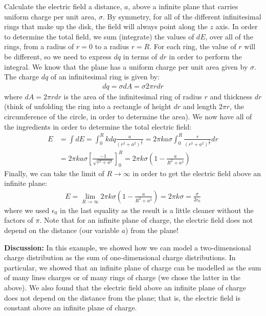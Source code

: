 \begin{example}{\label{ex:chargesfields:squarecircle}Calculate the electric field a distance, $a$, above a infinite plane that carries uniform charge per unit area, $\sigma$.}
By symmetry, for all of the different infinitesimal rings that make up the disk, the field will always point along the $z$ axis. In order to determine the total field, we sum (integrate) the values of $dE$, over all of the rings, from a radius of $r=0$ to a radius $r=R$. For each ring, the value of $r$ will be different, so we need to express $dq$ in terms of $dr$ in order to perform the integral. We know that the plane has a uniform charge per unit area given by $\sigma$. The charge $dq$ of an infinitesimal ring is given by:
\begin{align*}
dq = \sigma dA=\sigma 2\pi r dr
\end{align*}
where $dA=2\pi r dr$ is the area of the infinitesimal ring of radius $r$ and thickness $dr$ (think of unfolding the ring into a rectangle of height $dr$ and length $2\pi r$, the circumference of the circle, in order to determine the area). We now have all of the ingredients in order to determine the total electric field:
\begin{align*}
E &= \int dE = \int_0^R kdq\frac{a}{(r^2+a^2)^\frac{3}{2}}  = 2\pi k a \sigma \int_0^R \frac{r}{(r^2+a^2)^\frac{3}{2}}dr\\
&=2\pi k a \sigma \left[  \frac{-1}{\sqrt{r^2+a^2}}\right]_0^R=2\pi k  \sigma\left(1-\frac{a}{R^2+a^2} \right)
\end{align*}
Finally, we can take the limit of $R\to\infty$ in order to get the electric field above an infinite plane:
\begin{align*}
E=\lim_{R\to\infty}2\pi k  \sigma\left(1-\frac{a}{R^2+a^2} \right)=2\pi k\sigma=\frac{\sigma}{2\epsilon_0}
\end{align*}
where we used $\epsilon_0$ in the last equality as the result is a little cleaner without the factors of $\pi$. Note that for an infinite plane of charge, the electric field does not depend on the distance (our variable $a$) from the plane!

\textbf{Discussion:} In this example, we showed how we can model a two-dimensional charge distribution as the sum of one-dimensional charge distributions. In particular, we showed that an infinite plane of charge can be modelled as the sum of many lines charges or of many rings of charge (we chose the latter in the above). We also found that the electric field above an infinite plane of charge does not depend on the distance from the plane; that is, the electric field is constant above an infinite plane of charge. 
\end{example}


